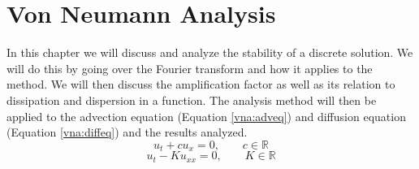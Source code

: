\chapter{Von Neumann Analysis}
In this chapter we will discuss and analyze the stability of a discrete solution. We will do this by going over the Fourier transform and how it applies to the method. We will then discuss the amplification factor as well as its relation to dissipation and dispersion in a function. The analysis method will then be applied to the advection equation (Equation \ref{vna:adveq}) and diffusion equation (Equation \ref{vna:diffeq}) and the results analyzed.
\begin{equation} \label{vna:adveq}
  u_t + cu_x = 0, \qquad c \in \mathbb{R}
\end{equation}
\begin{equation} \label{vna:diffeq}
  u_{t} - Ku_{xx} = 0, \qquad K \in \mathbb{R}
\end{equation}
